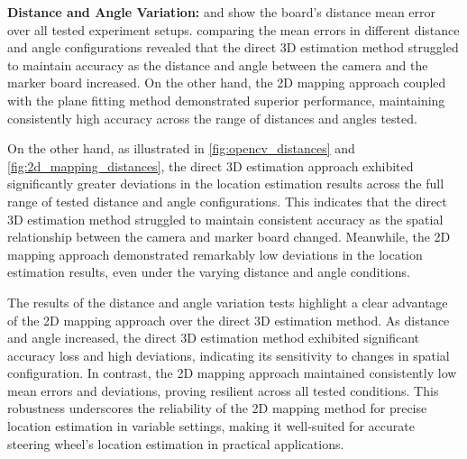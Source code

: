 \textbf{Distance and Angle Variation: }
 and  show the board’s distance mean error over all tested experiment setups. comparing the mean errors in different distance and angle configurations revealed that the direct 3D estimation method struggled to maintain accuracy as the distance and angle between the camera and the marker board increased. On the other hand, the 2D mapping approach coupled with the plane fitting method demonstrated superior performance, maintaining consistently high accuracy across the range of distances and angles tested. 


On the other hand, as illustrated in \cref{fig:opencv_distances} and \cref{fig:2d_mapping_distances}, the direct 3D estimation approach exhibited significantly greater deviations in the location estimation results across the full range of tested distance and angle configurations. This indicates that the direct 3D estimation method struggled to maintain consistent accuracy as the spatial relationship between the camera and marker board changed. Meanwhile, the 2D mapping approach demonstrated remarkably low deviations in the location estimation results, even under the varying distance and angle conditions.

The results of the distance and angle variation tests highlight a clear advantage of the 2D mapping approach over the direct 3D estimation method. As distance and angle increased, the direct 3D estimation method exhibited significant accuracy loss and high deviations, indicating its sensitivity to changes in spatial configuration. In contrast, the 2D mapping approach maintained consistently low mean errors and deviations, proving resilient across all tested conditions. This robustness underscores the reliability of the 2D mapping method for precise location estimation in variable settings, making it well-suited for accurate steering wheel’s location estimation in practical applications.

